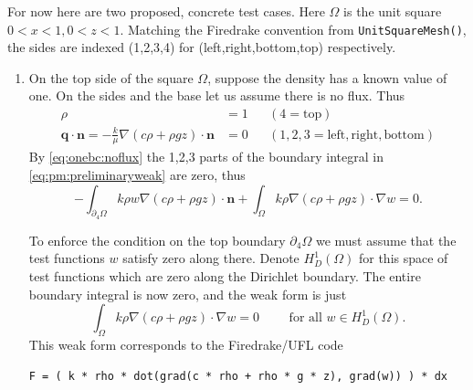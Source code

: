 \documentclass[11pt]{amsart}
\newcommand{\bn}{\mathbf{n}}
\newcommand{\bq}{\mathbf{q}}
\newcommand{\grad}{\nabla}
\begin{document}
For now here are two proposed, concrete test cases.  Here $\Omega$ is the unit square $0<x<1,0<z<1$.  Matching the Firedrake convention from \texttt{UnitSquareMesh()}, the sides are indexed (1,2,3,4) for (left,right,bottom,top) respectively.

\begin{enumerate}
\item On the top side of the square $\Omega$, suppose the density has a known value of one.  On the sides and the base let us assume there is no flux.  Thus
\begin{subequations}
\begin{align}
\rho &= 1 & &(4=\text{top}) \label{eq:onebc:dirichlet} \\
\bq \cdot \bn = - \frac{k}{\mu} \grad(c\rho + \rho g z) \cdot \bn &= 0 & &(1,2,3=\text{left},\text{right},\text{bottom}) \label{eq:onebc:noflux}
\end{align}
\end{subequations}
By \eqref{eq:onebc:noflux} the 1,2,3 parts of the boundary integral in \eqref{eq:pm:preliminaryweak} are zero, thus
	$$- \int_{\partial_4\Omega} k \rho w \grad\left(c \rho + \rho g z\right) \cdot \bn + \int_\Omega k \rho \grad\left(c \rho + \rho g z\right) \cdot \grad w = 0.$$

To enforce the condition on the top boundary $\partial_4\Omega$ we must assume that the test functions $w$ satisfy zero along there.  Denote $H_D^1(\Omega)$ for this space of test functions which are zero along the Dirichlet boundary.  The entire boundary integral is now zero, and the weak form is just
\begin{equation}
\int_\Omega k\rho \grad\left(c\rho + \rho g z\right) \cdot \grad w = 0 \qquad \text{ for all } w \in H_D^1(\Omega).\label{eq:pm:weakone}
\end{equation}
This weak form corresponds to the Firedrake/UFL code
\begin{Verbatim}[fontsize=\small]
    F = ( k * rho * dot(grad(c * rho + rho * g * z), grad(w)) ) * dx
\end{Verbatim}


\end{enumerate}
\end{document}
